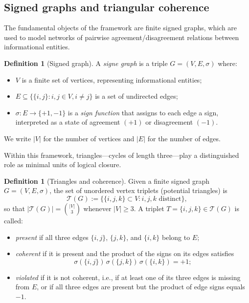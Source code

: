 \documentclass[11pt,a4paper]{article}
\theoremstyle{definition}
\newtheorem{definition}[theorem]{Definition}
\newcommand{\Ttri}{\mathcal{T}} %
\begin{document}
\subsection{Signed graphs and triangular coherence}

The fundamental objects of the framework are finite signed graphs, which are used to model networks of pairwise agreement/disagreement relations between informational entities.

\begin{definition}[Signed graph]
A \emph{signe graph} is a triple \(G = (V,E,\sigma)\) where:
\begin{itemize}
\item \(V\) is a finite set of vertices, representing informational entities;
\item \(E \subseteq \{ \{i,j\} : i,j \in V, i \neq j \}\) is a set of undirected edges;
\item \(\sigma : E \to \{+1,-1\}\) is a \emph{sign function} that assigns to each edge a sign, interpreted as a state of agreement \((+1)\) or disagreement \((-1)\).
\end{itemize}
We write \(|V|\) for the number of vertices and \(|E|\) for the number of edges.
\end{definition}

Within this framework, triangles—cycles of length three—play a distinguished role as minimal units of logical closure.

\begin{definition}[Triangles and coherence]
Given a finite signed graph \(G = (V,E,\sigma)\), the set of unordered vertex triplets (potential triangles) is
\[
 \Ttri(G) := \{ \{i,j,k\} \subset V : i,j,k \text{ distinct} \},
\]
so that \(|\Ttri(G)| = \binom{|V|}{3}\) whenever \(|V| \geq 3\). A triplet \(T = \{i,j,k\} \in \Ttri(G)\) is called:
\begin{itemize}
\item \emph{present} if all three edges \(\{i,j\}\), \(\{j,k\}\), and \(\{i,k\}\) belong to \(E\);
\item \emph{coherent} if it is present and the product of the signs on its edges satisfies
\[
 \sigma(\{i,j\})\,\sigma(\{j,k\})\,\sigma(\{i,k\}) = +1;
\]
\item \emph{violated} if it is not coherent, i.e., if at least one of its three edges is missing from \(E\), or if all three edges are present but the product of edge signs equals \(-1\).
\end{itemize}
\end{definition}
\end{document}
